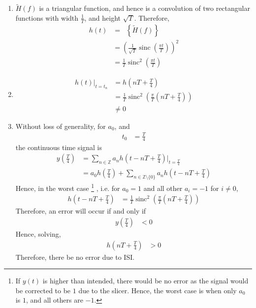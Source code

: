 \documentclass[titlepage, fleqn, a4paper, 12pt, twoside]{article}
\theoremstyle{definition}
\theoremstyle{theorem}
\renewcommand{\tilde}{\widetilde}
\DeclareMathOperator{\IFT}{\mathcal{F}^{-1}}
\DeclareMathOperator{\sinc}{\mathrm{sinc}}
\begin{document}
\begin{solution}
	\begin{enumerate}
		\item
			$\tilde{H}(f)$ is a triangular function, and hence is a convolution of two rectangular functions with width $\frac{1}{T}$, and height $\sqrt{T}$.
			Therefore,
			\begin{align*}
				h(t) &= \IFT\left\{ \tilde{H}(f) \right\}\\
				&= \left( \frac{1}{\sqrt{T}} \sinc\left( \frac{\pi t}{T} \right) \right)^2\\
				&= \frac{1}{T} \sinc^2\left( \frac{\pi t}{T} \right)
			\end{align*}
		\item
			\begin{align*}
				h(t) \Big|_{t = t_n} &= h\left( n T + \frac{T}{4} \right)\\
				&= \frac{1}{T} \sinc^2\left( \frac{\pi}{T} \left( n T + \frac{T}{4} \right) \right)\\
				&\neq 0
			\end{align*}
		\item
			Without loss of generality, for $a_0$, and
			\begin{align*}
				t_0 &= \frac{T}{4}
			\end{align*}
			the continuous time signal is
			\begin{align*}
				y\left( \frac{T}{4} \right) &= \sum\limits_{n \in \mathbb{Z}} a_n h\left( t - n T + \frac{T}{4} \right) \Big|_{t = \frac{T}{4}}\\
				&= a_0 h\left( \frac{T}{4} \right) + \sum\limits_{n \in \mathbb{Z} \setminus \{0\}} a_n h\left( t - n T + \frac{T}{4} \right)
			\end{align*}
			Hence, in the worst case
			\footnote{If $y(t)$ is higher than intended, there would be no error as the signal would be corrected to be $1$ due to the slicer. Hence, the worst case is when only $a_0$ is $1$, and all others are $-1$.}
			, i.e. for $a_0 = 1$ and all other $a_i = -1$ for $i \neq 0$,
			\begin{align*}
				h\left( t - n T + \frac{T}{4} \right) &= \frac{1}{T} \sinc^2\left( \frac{\pi}{T} \left( n T + \frac{T}{4} \right) \right)
			\end{align*}
			Therefore, an error will occur if and only if
			\begin{align*}
				y\left( \frac{T}{4} \right) &< 0
			\end{align*}
			Hence, solving,
			\begin{align*}
				h\left( n T + \frac{T}{4} \right) &> 0
			\end{align*}
			Therefore, there be no error due to ISI.
	\end{enumerate}
\end{solution}
\end{document}
